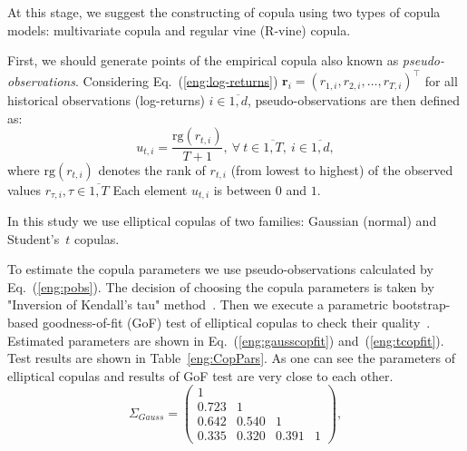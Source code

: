 At this stage, we suggest the constructing of copula using two types of copula models: multivariate copula and regular vine (R-vine) copula. 

First, we should generate points of the empirical copula also known as \textit{pseudo-observations}. 
Considering  Eq.~(\ref{eng:log-returns}) $\boldsymbol{r}_i = (r_{1,i}, r_{2,i},  \ldots, r_{T,i})^\intercal$ for all historical observations (log-returns) $i \in \overline{1,d}$, pseudo-observations are then defined as: %
\begin{equation} \label{eng:pobs}
    u_{t,i} = \frac{\text{rg}(r_{t,i})}{T + 1},\ \forall \ t \in \overline{1,T},\ i \in \overline{1,d},
\end{equation}
where
     $\text{rg}(r_{t,i})$ denotes the rank of $r_{t,i}$ (from lowest to highest) of the observed values $r_{\tau,i}, \tau \in \overline{1,T}$ \cite{Copula}
%
Each element $u_{t,i}$ is
between $0$ and $1$. 

In this study we use elliptical copulas of two families: Gaussian (normal) and Student's~$t$ copulas.

To estimate the copula parameters we use
pseudo-observations calculated by Eq.~(\ref{eng:pobs}). 
The decision of choosing the copula parameters is taken by "Inversion of Kendall’s tau" method~\cite{Koj2010}. 
Then we execute a parametric bootstrap-based goodness-of-fit (GoF) test of elliptical copulas to check their quality~\cite{Gen2009}. Estimated parameters are shown in Eq.~(\ref{eng:gausscopfit}) and~(\ref{eng:tcopfit}). Test results are shown in Table~\ref{eng:CopPars}. 
As one can see the parameters of elliptical copulas and results of GoF test are very close to each other.
\begin{equation} \label{eng:gausscopfit}
    \Sigma_{Gauss} = \left(
    \begin{array}{cccc}
        1 & & & \\
        0.723 & 1 & & \\
        0.642 & 0.540 & 1 & \\
        0.335 & 0.320 & 0.391 & 1
    \end{array} \right),
\end{equation}

